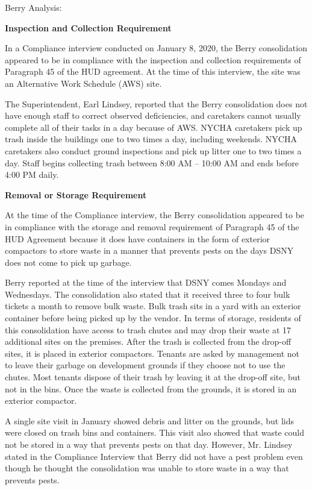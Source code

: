 Berry Analysis: 

\textbf{Inspection and Collection Requirement}

In a Compliance interview conducted on January 8, 2020, the Berry consolidation appeared to be in compliance with the inspection and collection requirements of Paragraph 45 of the HUD agreement. At the time of this interview, the site was an Alternative Work Schedule (AWS) site. 

The Superintendent, Earl Lindsey, reported that the Berry consolidation does not have enough staff to correct observed deficiencies, and caretakers cannot usually complete all of their tasks in a day because of AWS. NYCHA caretakers pick up trash inside the buildings one to two times a day, including weekends. NYCHA caretakers also conduct ground inspections and pick up litter one to two times a day. Staff begins collecting trash between 8:00 AM -- 10:00 AM and ends before 4:00 PM daily.

\textbf{Removal or Storage Requirement}

At the time of the Compliance interview, the Berry consolidation appeared to be in compliance with the storage and removal requirement of Paragraph 45 of the HUD Agreement because it does have containers in the form of exterior compactors to store waste in a manner that prevents pests on the days DSNY does not come to pick up garbage.

Berry reported at the time of the interview that DSNY comes Mondays and Wednesdays. The consolidation also stated that it received three to four bulk tickets a month to remove bulk waste. Bulk trash sits in a yard with an exterior container before being picked up by the vendor. In terms of storage, residents of this consolidation have access to trash chutes and may drop their waste at 17 additional sites on the premises. After the trash is collected from the drop-off sites, it is placed in exterior compactors. Tenants are asked by management not to leave their garbage on development grounds if they choose not to use the chutes. Most tenants dispose of their trash by leaving it at the drop-off site, but not in the bins. Once the waste is collected from the grounds, it is stored in an exterior compactor.  

A single site visit in January showed debris and litter on the grounds, but lids were closed on trash bins and containers.  This visit also showed that waste could not be stored in a way that prevents pests on that day. However, Mr. Lindsey stated in the Compliance Interview that Berry did not have a pest problem even though he thought the consolidation was unable to store waste in a way that prevents pests. 

